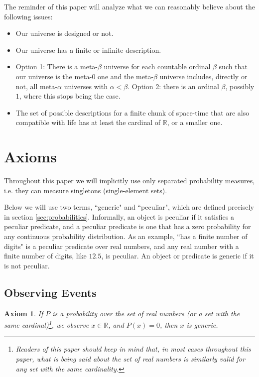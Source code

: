 \documentclass[a4paper
,draft
]{article}
\def\reale{\mathbb{R}}
\newcommand{\ghilimele}[1]{``#1"}
\newtheorem{axiom}{Axiom}
\begin{document}
The reminder of this paper will analyze what we can reasonably believe about
the following issues:
\begin{itemize}
  \item Our universe is designed or not.
  \item Our universe has a finite or infinite description.
  \item Option 1: There is a meta-$\beta$ universe for each countable ordinal
        $\beta$ such that our universe is the meta-$0$ one and the meta-$\beta$
        universe includes, directly or not, all meta-$\alpha$ universes with
        $\alpha < \beta$.
        Option 2: there is an ordinal $\beta$, possibly $1$,
        where this stops being the case.
  \item The set of possible descriptions for a finite chunk of space-time
        that are also compatible with life has at least the cardinal
        of $\reale$, or a smaller one.
\end{itemize}

\section{Axioms}
\label{sec:axioms}

Throughout this paper we will implicitly use only separated probability
measures, i.e. they can measure singletons (single-element sets).

Below we will use two terms, \ghilimele{generic} and \ghilimele{peculiar},
which are defined precisely in section \ref{sec:probabilities}. Informally,
an object is peculiar if it satisfies a peculiar predicate, and a peculiar
predicate is one that has a zero probability for any continuous probability
distribution. As an example,
\ghilimele{has a finite number of digits} is a peculiar
predicate over real numbers, and any real number with a finite number
of digits, like $12.5$, is peculiar. An object or predicate is generic if
it is not peculiar.

\subsection{Observing Events}
\begin{axiom}
  \label{ax:zeroisgeneric}
  If $P$ is a probability over the set of real numbers
  (or a set with the same cardinal)\footnote{Readers of this paper should
  keep in mind that, in most cases throughout this paper, what is being said
  about the set of real numbers is similarly valid for any set with the same
  cardinality.},
  we observe $x\in\reale$, and $P(x)=0$, then $x$ is generic.
\end{axiom}
\end{document}
